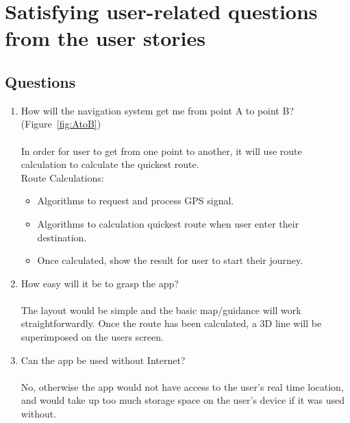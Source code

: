 \newpage

\section{Satisfying user-related questions from the user stories}
\subsection*{Questions}
\begin{enumerate}
    \item How will the navigation system get me from point A to point B? (Figure~\ref{fig:AtoB})\\\\
    In order for user to get from one point to another, it will use route calculation to calculate the quickest route.\\
    Route Calculations:
    \begin{itemize}
        \item Algorithms to request and process GPS signal.
        \item Algorithms to calculation quickest route when user enter their destination.
        \item Once calculated, show the result for user to start their journey.
    \end{itemize}
    
    \item How easy will it be to grasp the app?\\\\
    The layout would be simple and the basic map/guidance will work straightforwardly. Once the route has been calculated, a 3D line will be superimposed on the users screen.
    
    \item Can the app be used without Internet? \\\\
    No, otherwise the app would not have access to the user's real time location, and would take up too much storage space on the user's device if it was used without.
\end{enumerate}